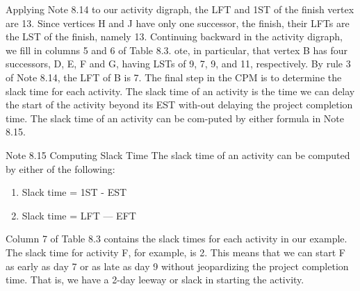 \documentclass{article}
\begin{document}
Applying Note 8.14 to our activity digraph, the LFT and 1ST of the finish vertex are 13. 
Since vertices H and J have only one successor, the finish, their LFTs are the LST of the finish, namely 13. 
Continuing backward in the activity digraph, we fill in columns 5 and 6 of Table 8.3. 
ote, in particular, that vertex B has four successors, D, E, F and G, having LSTs of 9, 7, 9, and 11, respectively. 
By rule 3 of Note 8.14, the LFT of B is 7. The final step in the CPM is to determine the slack time for each activity. 
The slack time of an activity is the time we can delay the start of the activity beyond its EST with-out delaying the project completion time. 
The slack time of an activity can be com-puted by either formula in Note 8.15. 
\begin{framed} Note 8.15 Computing Slack Time The slack time of an activity can be computed by either of the following: 
\begin{enumerate}
    \item Slack time = 1ST - EST 
\item Slack time = LFT — EFT 
\end{enumerate}

\end{framed}
Column 7 of Table 8.3 contains the slack times for each activity in our example. 
The slack time for activity F, for example, is 2. 
This means that we can start F as early as day 7 or as late as day 9 without jeopardizing the project completion time. 
That is, we have a 2-day leeway or slack in starting the activity. 
\end{document}
